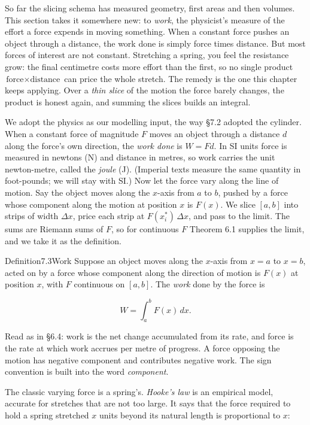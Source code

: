 \documentclass[a4paper,12pt,oneside]{memoir}
\begin{document}
So far the slicing schema has measured geometry, first areas and then volumes. This section takes it somewhere new: to \emph{work}, the physicist’s measure of the effort a force expends in moving something. When a constant force pushes an object through a distance, the work done is simply force times distance. But most forces of interest are not constant. Stretching a spring, you feel the resistance grow: the final centimetre costs more effort than the first, so no single product \(\text{force} \times \text{distance}\) can price the whole stretch. The remedy is the one this chapter keeps applying. Over a \emph{thin slice} of the motion the force barely changes, the product is honest again, and summing the slices builds an integral.

We adopt the physics as our modelling input, the way §7.2 adopted the cylinder. When a constant force of magnitude \(F\) moves an object through a distance \(d\) along the force’s own direction, the \emph{work done} is \(W = Fd\). In SI units force is measured in newtons (N) and distance in metres, so work carries the unit newton-metre, called the \emph{joule} (J). (Imperial texts measure the same quantity in foot-pounds; we will stay with SI.) Now let the force vary along the line of motion. Say the object moves along the \(x\)-axis from \(a\) to \(b\), pushed by a force whose component along the motion at position \(x\) is \(F(x)\). We slice \([a, b]\) into strips of width \(\Delta x\), price each strip at \(F(x_i^{*})\,\Delta x\), and pass to the limit. The sums are Riemann sums of \(F\), so for continuous \(F\) Theorem 6.1 supplies the limit, and we take it as the definition.

\begin{envdefinition}{Definition}{7.3}{Work}
Suppose an object moves along the \(x\)-axis from \(x = a\) to \(x = b\), acted on by a force whose component along the direction of motion is \(F(x)\) at position \(x\), with \(F\) continuous on \([a, b]\). The \emph{work} done by the force is

\[ W = \int_{a}^{b} F(x)\,dx. \]
\end{envdefinition}
Read as in §6.4: work is the net change accumulated from its rate, and force is the rate at which work accrues per metre of progress. A force opposing the motion has negative component and contributes negative work. The sign convention is built into the word \emph{component}.

The classic varying force is a spring’s. \emph{Hooke’s law} is an empirical model, accurate for stretches that are not too large. It says that the force required to hold a spring stretched \(x\) units beyond its natural length is proportional to \(x\):
\end{document}
